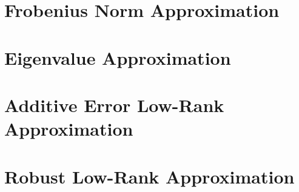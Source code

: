 \section{Frobenius Norm Approximation}
\label{sec:frobenius-norm-approximation}


\section{Eigenvalue Approximation}
\label{sec:eigenvalue-approximation}


\section{Additive Error Low-Rank Approximation}
\label{sec:additive-lra}


\section{Robust Low-Rank Approximation}
\label{sec:robust-lra}




